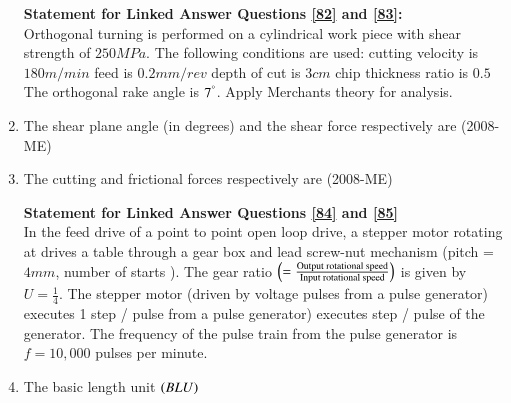 \documentclass[journal]{IEEEtran}
\begin{document}
\begin{enumerate}
\begin{enumerate}
 \end{enumerate}
 \textbf{Statement for Linked Answer Questions \ref{82} and \ref{83}:} \\
 Orthogonal turning is performed on a cylindrical work piece with shear strength of $250MPa.$
 The following conditions are used: cutting velocity is $180m/min$
 feed is $0.2mm/rev$
 depth of cut is $3cm$
 chip thickness ratio is $0.5$
 The orthogonal rake angle is $7^\degree$.
 Apply Merchants theory for analysis. \\
 \item The shear plane angle (in degrees) and the shear force respectively are \label{82} \hfill(2008-ME)
 \begin{enumerate}
 \end{enumerate}
 \item The cutting and frictional forces respectively are \label{83} \hfill(2008-ME)
\begin{enumerate}
\end{enumerate}
\textbf{Statement for Linked Answer Questions \ref{84} and \ref{85}} \\
In the feed drive of a point to point open loop 
 drive, a stepper motor rotating at 
 drives a table through a gear box and lead screw-nut mechanism (pitch = $4mm$, number of starts 
). The gear ratio $\left(= \frac{\text{Output rotational speed}}{\text{Input rotational speed}}\right)$ is given by $U = \frac{1}{4}$.
 The stepper motor (driven by voltage pulses from a pulse generator) executes 1
 step / pulse from a pulse generator) executes 
 step / pulse of the generator. The frequency of the pulse train from the pulse generator is $f = 10,000$ pulses per minute. \\
 
 \item The basic length unit $\left(BLU\right)$

\end{enumerate}
\end{document}
